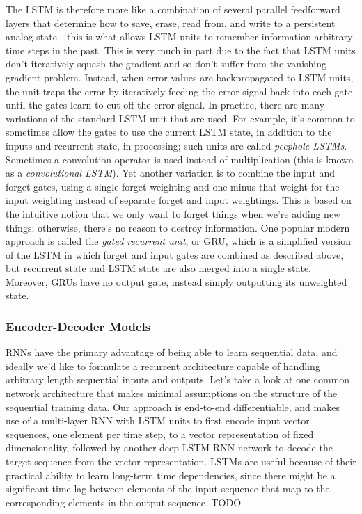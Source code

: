 \documentclass{article}
\begin{document}
The LSTM is therefore more like a combination of several parallel feedforward layers that determine how to save, erase, read from, and write to a persistent analog state - this is what allows LSTM units to remember information arbitrary time steps in the past. This is very much in part due to the fact that LSTM units don't iteratively squash the gradient and so don't suffer from the vanishing gradient problem. Instead, when error values are backpropagated to LSTM units, the unit traps the error by iteratively feeding the error signal back into each gate until the gates learn to cut off the error signal.
\newline \newline
In practice, there are many variations of the standard LSTM unit that are used. For example, it's common to sometimes allow the gates to use the current LSTM state, in addition to the inputs and recurrent state, in processing; such units are called \textit{peephole LSTMs}. Sometimes a convolution operator is used instead of multiplication (this is known as a \textit{convolutional LSTM}). Yet another variation is to combine the input and forget gates, using a single forget weighting and one minus that weight for the input weighting instead of separate forget and input weightings. This is based on the intuitive notion that we only want to forget things when we're adding new things; otherwise, there's no reason to destroy information. One popular modern approach is called the \textit{gated recurrent unit}, or GRU, which is a simplified version of the LSTM in which forget and input gates are combined as described above, but recurrent state and LSTM state are also merged into a single state. Moreover, GRUs have no output gate, instead simply outputting its unweighted state.

\subsubsection{Encoder-Decoder Models}
RNNs have the primary advantage of being able to learn sequential data, and ideally we'd like to formulate a recurrent architecture capable of handling arbitrary length sequential inputs and outputs. Let's take a look at one common network architecture that makes minimal assumptions on the structure of the sequential training data. Our approach is end-to-end differentiable, and makes use of a multi-layer RNN with LSTM units to first encode input vector sequences, one element per time step, to a vector representation of fixed dimensionality, followed by another deep LSTM RNN network to decode the target sequence from the vector representation. LSTMs are useful because of their practical ability to learn long-term time dependencies, since there might be a significant time lag between elements of the input sequence that map to the corresponding elements in the output sequence.
\newline
TODO
\end{document}
